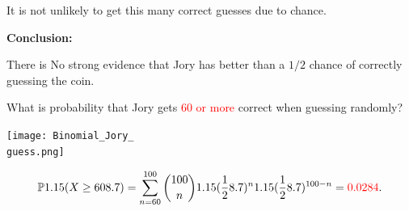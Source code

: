 \begin{frame}[fragile]
 \begin{center}
 \begin{minipage}{0.6\textwidth}
 \begin{center}
  It is not unlikely to get this many correct guesses due to chance.

  \bigskip
  \bigskip

  {\bf Conclusion:}\\
  \bigskip

  There is No strong evidence that Jory has better than a $1/2$ chance of correctly guessing the coin.

\end{center}
 \end{minipage}
\end{center}
\end{frame}
\begin{frame}[fragile]
\def\guess{60}
\def\ans{0.0284}
  \begin{center}
    What is probability that Jory gets \textcolor{red}{\guess\: or more} correct when guessing randomly?
 \bigskip
  \pause

 \texttt{[image: Binomial\_Jory\_\\guess.png]}
  \end{center}
\bigskip
\begin{align*}
  \bbP\left(X\ge \guess\right) = \sum_{n=\guess}^{100} \binom{100}{n} \left(\frac{1}{2}\right)^n \left(\frac{1}{2}\right)^{100-n} = \textcolor{red}{\ans}.
\end{align*}
 \end{frame}

